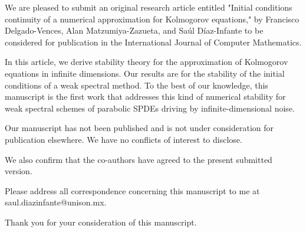 \documentclass[10pt ,stdletter, dateno, sigleft]{newlfm}
\begin{document}
    \begin{newlfm}
    
             We are pleased to submit an original research article entitled
        "Initial conditions continuity of a numerical approximation for 
        Kolmogorov equations," by Francisco Delgado-Vences, Alan 
        Matzumiya-Zazueta, and Sa\'ul D\'iaz-Infante to be considered for 
        publication in the International Journal of Computer Mathematics.

            In this article, we derive stability theory for the approximation 
        of Kolmogorov equations in infinite dimensions. Our results are for the 
        stability of the initial conditions of a weak spectral method. To the 
        best of our knowledge, this manuscript is the first work that 
        addresses this kind of numerical stability for weak spectral 
        schemes of parabolic SPDEs driving by infinite-dimensional 
        noise.
    
            Our manuscript has not been published and is not under 
        consideration for publication elsewhere. We have no conflicts of 
        interest to disclose.
        
        We also confirm that the co-authors have agreed to the present 
        submitted version.
        
        Please address all correspondence concerning this manuscript to me at 
        saul.diazinfante@unison.mx.
        
        Thank you for your consideration of this manuscript.
     
 \end{newlfm}
\end{document}
